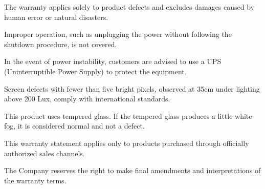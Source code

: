 \documentclass[11pt,a4paper]{article}
\begin{document}

\begin{tbkList}
  \item The warranty applies solely to product defects and excludes damages
        caused by human error or natural disasters.
  \item Improper operation, such as unplugging the power without following
        the shutdown procedure, is not covered.
  \item In the event of power instability, customers are advised to use a UPS
        (Uninterruptible Power Supply) to protect the equipment.
  \item Screen defects with fewer than five bright pixels, observed at 35cm
        under lighting above 200 Lux, comply with international standards.
  \item This product uses tempered glass. If the tempered glass produces a
        little white fog, it is considered normal and not a defect.
\end{tbkList}


\begin{tbkList}
  \item This warranty statement applies only to products purchased through
        officially authorized sales channels.
  \item The Company reserves the right to make final amendments and
        interpretations of the warranty terms.
\end{tbkList}


\begin{tbkSpecTable}[caption={Taiwan Main Orthopaedic Biotechnology Co., Ltd.},label=tbl:contact]
\end{tbkSpecTable}


\clearpage
{}
\end{document}
